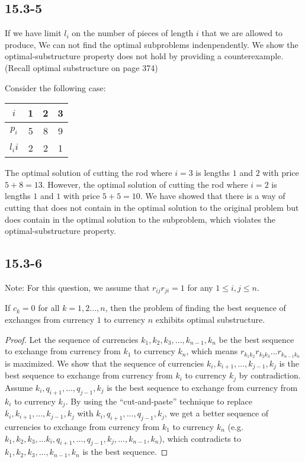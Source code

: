 \subsection*{15.3-5}

\noindent
If we have limit $l_i$ on the number of pieces of length $i$ 
that we are allowed to produce,
We can not find the optimal subproblems indenpendently.
We show the optimal-substructure property does not hold
by providing a counterexample. 
(Recall optimal substructure on page 374)

\noindent
Consider the following case:

\begin{tabular}{c||c|c|c}
    $i$     & 1 & 2 & 3 \\
    \hline
    $p_i$   & 5 & 8 & 9 \\
    $l_ii$  & 2 & 2 & 1
\end{tabular}

\noindent
The optimal solution of cutting the rod where $i=3$ is 
lengths $1$ and $2$ with price $5+8=13$.
However, the optimal solution of cutting the rod where $i=2$ is
lengths $1$ and $1$ with price $5+5=10$.
We have showed that there is a way of cutting that 
does not contain in the optimal solution to the original problem
but does contain in the optimal solution to the subproblem,
which violates the optimal-substructure property.

\subsection*{15.3-6}

\noindent
Note: For this question, we assume that $r_{ij}r_{ji}=1$ 
for any $1 \leq i,j \leq n$.

\begin{claim}
    If $c_k = 0$ for all $k = 1,2...,n$, 
    then the problem of finding the best sequence of exchanges 
    from currency $1$ to currency $n$ exhibits optimal substructure.
\end{claim}

\begin{proof}
    Let the sequence of currencies $k_1,k_2,k_3,...,k_{n-1},k_n$ 
    be the best sequence
    to exchange from currency from $k_1$ to currency $k_n$,
    which means $r_{k_1k_2}r_{k_2k_3}...r_{k_{n-1}k_n}$ is maximized.
    We show that the sequence of currencies 
    $k_i,k_{i+1},...,k_{j-1},k_{j}$ is the best sequence to exchange
    from currency from $k_i$ to currency $k_j$ by contradiction.
    Assume $k_i,q_{i+1},...,q_{j-1},k_{j}$ is the best sequence to exchange
    from currency from $k_i$ to currency $k_j$.
    By using the ``cut-and-paste'' technique to replace 
    $k_i,k_{i+1},...,k_{j-1},k_{j}$ with
    $k_i,q_{i+1},...,q_{j-1},k_{j}$,
    we get a better sequence of currencies to 
    exchange from currency from $k_1$ to currency $k_n$
    (e.g. $k_1,k_2,k_3,...k_i,q_{i+1},...,q_{j-1},k_{j},...,k_{n-1},k_n$),
    which contradicts to $k_1,k_2,k_3,...,k_{n-1},k_n$ is the best sequence.
\end{proof}

